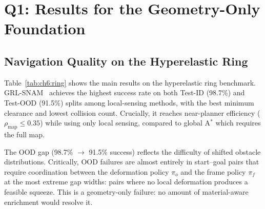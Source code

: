 \section{Q1: Results for the Geometry-Only Foundation}
\label{sec:ch6:geom_results}

\subsection{Navigation Quality on the Hyperelastic Ring}
\label{subsec:ch6:ring}

Table~\ref{tab:ch6:ring} shows the main results on the hyperelastic
ring benchmark.
GRL-SNAM~\citep{ellendula2025grlsnam} achieves the highest success rate on both Test-ID (98.7\%)
and Test-OOD (91.5\%) splits among local-sensing methods, with the best
minimum clearance and lowest collision count.
Crucially, it reaches near-planner efficiency ($\rho_{\mathrm{map}} \leq 0.35$)
while using only local sensing, compared to global A$^*$ which requires
the full map.

The OOD gap (98.7\% $\to$ 91.5\% success) reflects the difficulty
of shifted obstacle distributions.
Critically, OOD failures are almost entirely in start–goal pairs that
require coordination between the deformation policy $\pi_o$ and the
frame policy $\pi_f$ at the most extreme gap widths: pairs where no
local deformation produces a feasible squeeze.
This is a geometry-only failure: no amount of material-aware enrichment
would resolve it.

